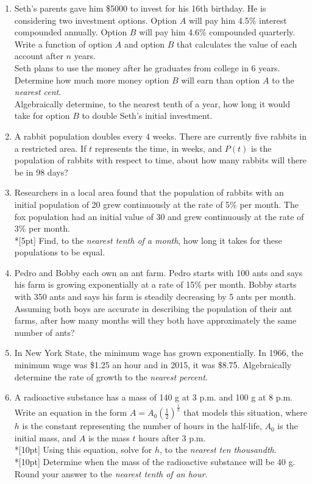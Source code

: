 \documentclass[12pt, oneside]{article}
\begin{document}
\begin{enumerate}
\item Seth’s parents gave him \$5000 to invest for his 16th birthday. He is considering two investment options. Option $A$ will pay him 4.5\% interest compounded annually. Option $B$ will pay him 4.6\% compounded quarterly.\\[10pt]
Write a function of option $A$ and option $B$ that calculates the value of each account after $n$ years.\\[1in]
Seth plans to use the money after he graduates from college in 6 years. Determine how much more money option $B$ will earn than option $A$ to the \emph{nearest cent}.\\[1in]
Algebraically determine, to the nearest tenth of a year, how long it would take for option $B$ to double Seth’s initial investment. %

\item A rabbit population doubles every 4 weeks. There are currently five rabbits in a restricted area. If $t$ represents the time, in weeks, and $P(t)$ is the population of rabbits with respect to time, about how many rabbits will there be in 98 days? %

\item Researchers in a local area found that the population of rabbits with an initial population of 20 grew continuously at the rate of 5\% per month. The fox population had an initial value of 30 and grew continuously at the rate of 3\% per month.\\*[5pt]
Find, to the \emph{nearest tenth of a month}, how long it takes for these populations to be equal. %

\item Pedro and Bobby each own an ant farm. Pedro starts with 100 ants and says his farm is growing exponentially at a rate of 15\% per month. Bobby starts with 350 ants and says his farm is steadily decreasing by 5 ants per month.\\[5pt]
Assuming both boys are accurate in describing the population of their ant farms, after how many months will they both have approximately the same number of ants? %

\item In New York State, the minimum wage has grown exponentially. In 1966, the minimum wage was \$1.25 an hour and in 2015, it was \$8.75. Algebraically determine the rate of growth to the \emph{nearest percent}.

\item A radioactive substance has a mass of 140 g at 3 p.m. and 100 g at 8 p.m. Write an equation in the form $A = A_0 \left( \frac{1}{2} \right)^{\frac{t}{h}}$ that models this situation, where $h$ is the constant representing the number of hours in the half-life, $A_0$ is the initial mass, and $A$ is the mass $t$ hours after 3 p.m.\\*[10pt]
Using this equation, solve for $h$, to the \emph{nearest ten thousandth}. \\*[10pt]
Determine when the mass of the radioactive substance will be 40 g. Round your answer to the \emph{nearest tenth of an hour}.
 

\end{enumerate}
\end{document}

